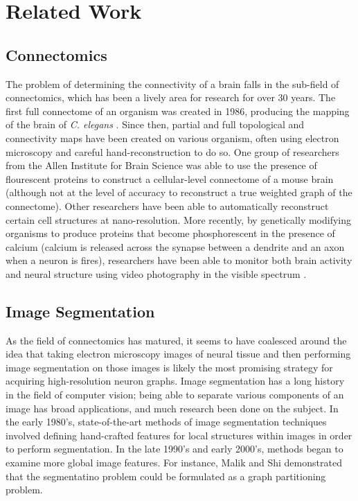 \section{Related Work}

\subsection{Connectomics}

The problem of determining the connectivity of a brain falls in the sub-field of connectomics, which has been a lively area for research for over 30 years. The first full connectome of an organism was created in 1986, producing the mapping of the brain of \textit{C. elegans} \cite{White1986}. Since then, partial and full topological and connectivity maps have been created on various organism, often using electron microscopy and careful hand-reconstruction to do so. One group of researchers from the Allen Institute for Brain Science was able to use the presence of flourescent proteins to construct a cellular-level connectome of a mouse brain (although not at the level of accuracy to reconstruct a true weighted graph of the connectome)\cite{Oh2014}. Other researchers have been able to automatically reconstruct certain cell structures at nano-resolution\cite{Kasthuri2015}. More recently, by genetically modifying organisms to produce proteins that become phosphorescent in the presence of calcium (calcium is released across the synapse between a dendrite and an axon when a neuron is fires), researchers have been able to monitor both brain activity and neural structure using video photography in the visible spectrum \cite{Nguyen2015}. 

\subsection{Image Segmentation}

As the field of connectomics has matured, it seems to have coalesced around the idea that taking electron microscopy images of neural tissue and then performing image segmentation on those images is likely the most promising strategy for acquiring high-resolution neuron graphs. Image segmentation has a long history in the field of computer vision; being able to separate various components of an image has broad applications, and much research been done on the subject. In the early 1980's, state-of-the-art methods of image segmentation techniques involved defining hand-crafted features for local structures within images in order to perform segmentation\cite{Haralick1985}. In the late 1990's and early 2000's, methods began to examine more global image features. For instance, Malik and Shi demonstrated that the segmentatino problem could be formulated as a graph partitioning problem\cite{JianboShi2000}.


